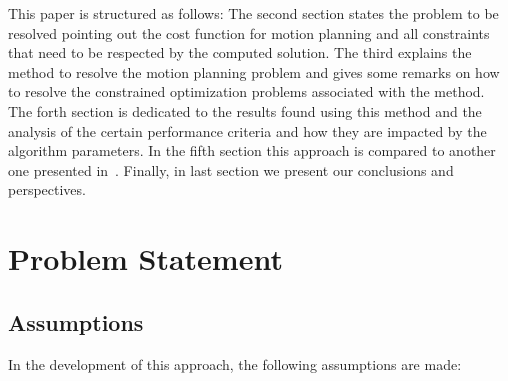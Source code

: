 \documentclass[eprint]{actapoly}
\begin{document}
This paper is structured as follows: The second section states the problem to
be resolved pointing out the cost function for motion planning and all constraints
that need to be respected by the computed solution.
The third explains the method to resolve the motion planning problem and gives
some remarks on how to resolve the constrained optimization problems associated
with the method.
The forth section is dedicated to the results found using
this method and the analysis of the certain performance criteria and 
how they are impacted by the algorithm parameters. In the fifth section this
approach is compared to another one presented in~\cite{Kelly_2003}.
Finally, in last section we present our conclusions and perspectives.


\section{Problem Statement}\label{sec:problem}

\subsection{Assumptions}
In the development of this approach, the following assumptions are made:
\end{document}

